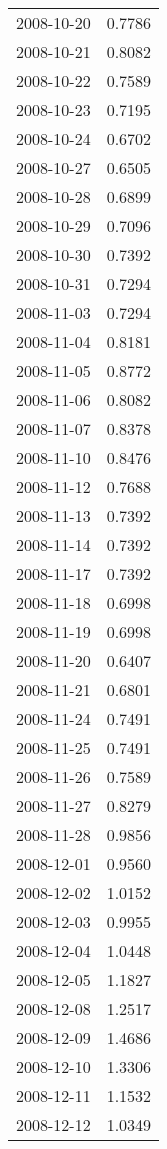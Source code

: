 \begin{tabular}{lr}
2008-10-20 &      0.7786 \\
2008-10-21 &      0.8082 \\
2008-10-22 &      0.7589 \\
2008-10-23 &      0.7195 \\
2008-10-24 &      0.6702 \\
2008-10-27 &      0.6505 \\
2008-10-28 &      0.6899 \\
2008-10-29 &      0.7096 \\
2008-10-30 &      0.7392 \\
2008-10-31 &      0.7294 \\
2008-11-03 &      0.7294 \\
2008-11-04 &      0.8181 \\
2008-11-05 &      0.8772 \\
2008-11-06 &      0.8082 \\
2008-11-07 &      0.8378 \\
2008-11-10 &      0.8476 \\
2008-11-12 &      0.7688 \\
2008-11-13 &      0.7392 \\
2008-11-14 &      0.7392 \\
2008-11-17 &      0.7392 \\
2008-11-18 &      0.6998 \\
2008-11-19 &      0.6998 \\
2008-11-20 &      0.6407 \\
2008-11-21 &      0.6801 \\
2008-11-24 &      0.7491 \\
2008-11-25 &      0.7491 \\
2008-11-26 &      0.7589 \\
2008-11-27 &      0.8279 \\
2008-11-28 &      0.9856 \\
2008-12-01 &      0.9560 \\
2008-12-02 &      1.0152 \\
2008-12-03 &      0.9955 \\
2008-12-04 &      1.0448 \\
2008-12-05 &      1.1827 \\
2008-12-08 &      1.2517 \\
2008-12-09 &      1.4686 \\
2008-12-10 &      1.3306 \\
2008-12-11 &      1.1532 \\
2008-12-12 &      1.0349 \\

\end{tabular}
